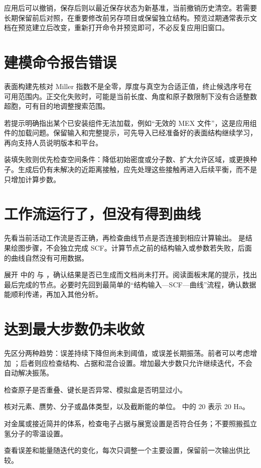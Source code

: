 应用后可以撤销，保存后则以最近保存状态为新基准，当前撤销历史清空。若需要长期保留前后对照，在重要修改前另存项目或保留独立结构。预览过期通常表示文档在预览建立后改变，重新打开命令并预览即可，不必反复应用旧窗口。

\section{建模命令报告错误}

表面构建先核对 Miller 指数不是全零，厚度与真空为合适正值，终止候选序号在可用范围内。正交化失败时，可能是当前长度、角度和原子数限制下没有合适整数超胞，可有目的地调整搜索范围。

若提示明确指出某个已安装组件无法加载，例如“无效的 MEX 文件”，这是应用组件的加载问题。保留输入和完整提示，可先导入已经准备好的表面结构继续学习，再向支持人员说明版本和平台。

装填失败则优先检查空间条件：降低初始密度或分子数、扩大允许区域，或更换种子。生成后仍有未解决的近距离接触，应先处理这些接触再进入后续平衡，而不是只增加计算步数。

\section{工作流运行了，但没有得到曲线}

先看当前活动工作流是否正确，再检查曲线节点是否连接到相应计算输出。 是结果绘图步骤，不会独立完成 SCF。计算节点之前的结构输入或参数若失败，后面的曲线自然没有可用数据。

展开  中的  与 ，确认结果是否已生成而文档尚未打开。阅读面板末尾的提示，找出最后完成的节点。必要时先回到最简单的“结构输入—SCF—曲线”流程，确认数据能顺利传递，再加入其他分析。

\section{ 达到最大步数仍未收敛}

先区分两种趋势：误差持续下降但尚未到阈值，或误差长期振荡。前者可以考虑增加 ；后者则应检查结构、占据和混合设置。增加最大步数只允许继续迭代，不会自动解决振荡。

\begin{steps}
\item 检查原子是否重叠、键长是否异常、模拟盒是否明显过小。
\item 核对元素、赝势、分子或晶体类型，以及截断能的单位。 中的 20 表示 20 Ha。
\item 对金属或接近简并的体系，检查电子占据与展宽设置是否符合任务；不要照搬孤立氢分子的零温设置。
\item 查看误差和能量随迭代的变化，每次只调整一个主要设置，保留前一次输出供比较。
\end{steps}

